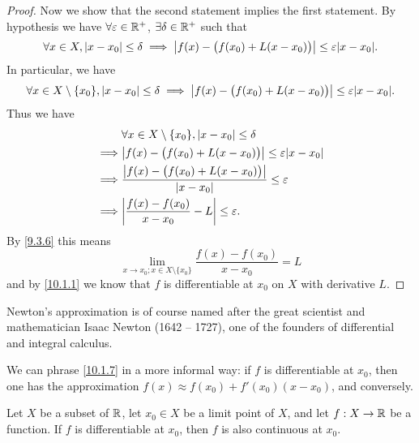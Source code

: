\begin{proof}
  Now we show that the second statement implies the first statement.
  By hypothesis we have \(\forall \varepsilon \in \mathbb{R}^+\), \(\exists \delta \in \mathbb{R}^+\) such that
  \[
    \forall x \in X, \abs{x - x_0} \leq \delta \implies \abs{f(x) - \big(f(x_0) + L(x - x_0)\big)} \leq \varepsilon \abs{x - x_0}.
  \]
  In particular, we have
  \[
    \forall x \in X \setminus \{x_0\}, \abs{x - x_0} \leq \delta \implies \abs{f(x) - \big(f(x_0) + L(x - x_0)\big)} \leq \varepsilon \abs{x - x_0}.
  \]
  Thus we have
  \begin{align*}
             & \forall x \in X \setminus \{x_0\}, \abs{x - x_0} \leq \delta                       \\
    \implies & \abs{f(x) - \big(f(x_0) + L(x - x_0)\big)} \leq \varepsilon \abs{x - x_0}          \\
    \implies & \dfrac{\abs{f(x) - \big(f(x_0) + L(x - x_0)\big)}}{\abs{x - x_0}} \leq \varepsilon \\
    \implies & \abs{\dfrac{f(x) - f(x_0)}{x - x_0} - L} \leq \varepsilon.
  \end{align*}
  By \cref{9.3.6} this means
  \[
    \lim_{x \to x_0 ; x \in X \setminus \{x_0\}} \dfrac{f(x) - f(x_0)}{x - x_0} = L
  \]
  and by \cref{10.1.1} we know that \(f\) is differentiable at \(x_0\) on \(X\) with derivative \(L\).
\end{proof}

\begin{rmk}\label{10.1.8}
  Newton's approximation is of course named after the great scientist and mathematician Isaac Newton (1642 -- 1727), one of the founders of differential and integral calculus.
\end{rmk}

\begin{rmk}\label{10.1.9}
  We can phrase \cref{10.1.7} in a more informal way:
  if \(f\) is differentiable at \(x_0\), then one has the approximation \(f(x) \approx f(x_0) + f'(x_0)(x - x_0)\), and conversely.
\end{rmk}

\begin{prop}\label{10.1.10}
  Let \(X\) be a subset of \(\mathbb{R}\), let \(x_0 \in X\) be a limit point of \(X\), and let \(f : X \to \mathbb{R}\) be a function.
  If \(f\) is differentiable at \(x_0\), then \(f\) is also continuous at \(x_0\).
\end{prop}

